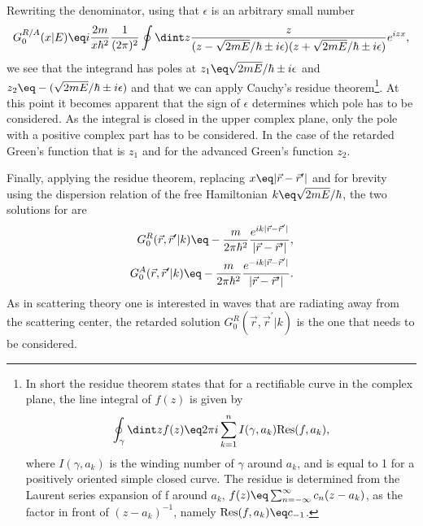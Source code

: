 \documentclass[\main/dresen_thesis.tex]{subfiles}
\begin{document}
    Rewriting the denominator, using that $\epsilon$ is an arbitrary small number
    \begin{align}
      G_0^{R/A}(x | E) \eq i \frac{2m}{x\hbar^2} \frac{1}{(2\pi)^2} \oint \dint z \frac{z}{(z - \sqrt{2mE}/\hbar \pm i \epsilon)(z + \sqrt{2mE}/\hbar \pm i \epsilon)} e^{i z x},
    \end{align}
    we see that the integrand has poles at $z_1 \eq \sqrt{2mE}/\hbar \pm i \epsilon$ and $z_2 \eq -(\sqrt{2mE}/\hbar \pm i \epsilon)$ and that we can apply Cauchy's residue theorem\footnote{
      In short the residue theorem states that for a rectifiable curve in the complex plane, the line integral of $f(z)$ is given by
      \begin{align}
        \oint_\gamma \dint z f(z) \eq 2 \pi i \sum_{k=1}^n I(\gamma, a_k) \mathrm{Res}(f, a_k)\nonumber,
      \end{align}
      where $I(\gamma, a_k)$ is the winding number of $\gamma$ around $a_k$, and is equal to 1 for a positively oriented simple closed curve. The residue is determined from the Laurent series expansion of f around $a_k$, $f(z) \eq \sum_{n=-\infty}^\infty c_n (z-a_k)$, as the factor in front of $(z - a_k)^{-1}$, namely $\mathrm{Res}(f, a_k) \eq c_{-1}$.
    }.
    At this point it becomes apparent that the sign of $\epsilon$ determines which pole has to be considered.
    As the integral is closed in the upper complex plane, only the pole with a positive complex part has to be considered.
    In the case of the retarded Green's function that is $z_1$ and for the advanced Green's function $z_2$.

    Finally, applying the residue theorem, replacing $x \eq |\vec{r} - \vec{r}^\prime|$ and for brevity using the dispersion relation of the free Hamiltonian $k \eq \sqrt{2mE}/\hbar$, the two solutions for  are
    \begin{align}
      G_0^R(\vec{r},  \vec{r}^\prime | k) \eq - \frac{m}{ 2\pi\hbar^2}  \frac {e^{i k |\vec{r} - \vec{r}^\prime|}}{|\vec{r} - \vec{r}^\prime|},\\
      G_0^A(\vec{r},  \vec{r}^\prime | k) \eq - \frac{m}{ 2\pi\hbar^2}  \frac {e^{-i k |\vec{r} - \vec{r}^\prime|}}{|\vec{r} - \vec{r}^\prime|}.
    \end{align}
    As in scattering theory one is interested in waves that are radiating away from the scattering center, the retarded solution $G_0^R(\vec{r},  \vec{r}^\prime | k)$ is the one that needs to be considered.
\end{document}
